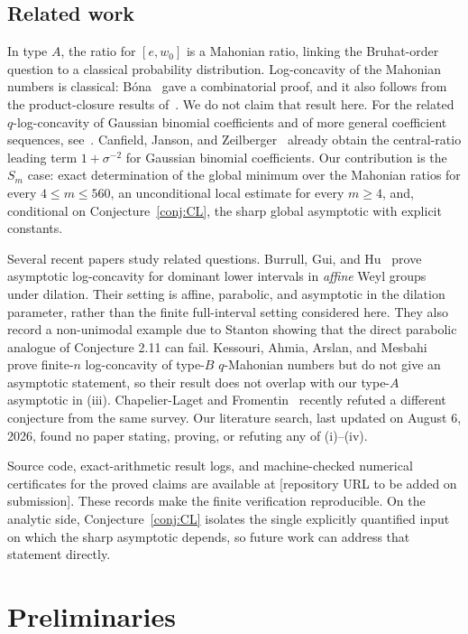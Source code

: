 \documentclass[11pt]{amsart}
\theoremstyle{plain}
\theoremstyle{definition}
\theoremstyle{remark}
\begin{document}
\subsection*{Related work} In type $A$, the ratio for $[e,w_0]$ is a
Mahonian ratio, linking the Bruhat-order question to a classical
probability distribution. Log-concavity of the Mahonian numbers is
classical: B\'ona~\cite{bona2004} gave a combinatorial proof, and it also
follows from the
product-closure results of~\cite{hoggar1974,kook2006}. We do not claim that
result here. For the related $q$-log-concavity of Gaussian binomial
coefficients and of more general coefficient sequences,
see~\cite{butler1990,sagan1992,suwangyeh2011}. Canfield, Janson, and Zeilberger~\cite{cjz2011} already obtain
the central-ratio leading term $1+\sigma^{-2}$ for Gaussian binomial
coefficients. Our contribution is the $S_m$ case: exact determination of
the global minimum over the Mahonian ratios for every $4\le m\le560$, an
unconditional local estimate for every $m\ge4$, and, conditional on
Conjecture~\ref{conj:CL}, the sharp global asymptotic with explicit
constants.

Several recent papers study related questions.
Burrull, Gui, and Hu~\cite{burrull-gui-hu} prove asymptotic
log-concavity for dominant lower intervals in \emph{affine} Weyl groups
under dilation. Their setting is affine, parabolic, and asymptotic in the
dilation parameter, rather than the finite full-interval setting considered
here. They also record a non-unimodal example due to Stanton showing that
the direct parabolic analogue of Conjecture 2.11 can fail. Kessouri, Ahmia,
Arslan, and Mesbahi~\cite{kessouri2024} prove finite-$n$ log-concavity of
type-$B$ $q$-Mahonian numbers but do not give an asymptotic statement, so
their result does not overlap with our type-$A$ asymptotic in (iii). Chapelier-Laget and Fromentin~\cite{chapelier-fromentin} recently refuted
a different conjecture from the same survey. Our literature search, last updated on August 6, 2026, found no paper stating, proving, or refuting any of
(i)--(iv).

Source code, exact-arithmetic result logs, and machine-checked numerical
certificates for the proved claims are available at
[repository URL to be added on submission]. These records make the finite
verification reproducible. On the analytic side,
Conjecture~\ref{conj:CL} isolates the single explicitly quantified input on
which the sharp asymptotic depends, so future work can address that
statement directly.

\section{Preliminaries}
\label{sec:prelim}
\end{document}
